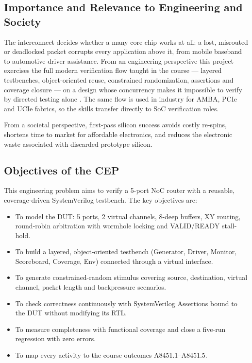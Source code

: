 \documentclass[11pt,a4paper]{report}  %
\begin{document}
\subsection{Importance and Relevance to Engineering and Society}

The interconnect decides whether a many-core chip works at all: a lost,
misrouted or deadlocked packet corrupts every application above it, from mobile
baseband to automotive driver assistance. From an engineering perspective this
project exercises the full modern verification flow taught in the course ---
layered testbenches, object-oriented reuse, constrained randomization,
assertions and coverage closure --- on a design whose concurrency makes it
impossible to verify by directed testing alone \cite{Spear}. The same flow is
used in industry for AMBA, PCIe and UCIe fabrics, so the skills transfer
directly to SoC verification roles.

From a societal perspective, first-pass silicon success avoids costly re-spins,
shortens time to market for affordable electronics, and reduces the electronic
waste associated with discarded prototype silicon.

\subsection{Objectives of the CEP}

This engineering problem aims to verify a 5-port NoC router with a reusable,
coverage-driven SystemVerilog testbench. The key objectives are:

\begin{itemize}
    \item To model the DUT: 5 ports, 2 virtual channels, 8-deep buffers, XY
    routing, round-robin arbitration with wormhole locking and VALID/READY
    stall-hold.
    \item To build a layered, object-oriented testbench (Generator, Driver,
    Monitor, Scoreboard, Coverage, Env) connected through a virtual interface.
    \item To generate constrained-random stimulus covering source, destination,
    virtual channel, packet length and backpressure scenarios.
    \item To check correctness continuously with SystemVerilog Assertions bound
    to the DUT without modifying its RTL.
    \item To measure completeness with functional coverage and close a
    five-run regression with zero errors.
    \item To map every activity to the course outcomes A8451.1--A8451.5.
\end{itemize}
\end{document}
